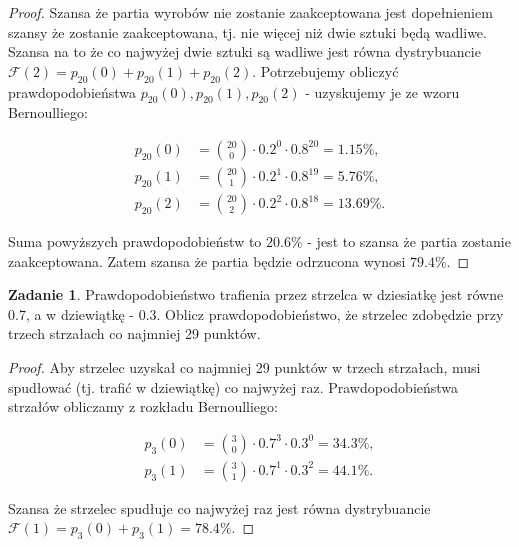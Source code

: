 \documentclass[11pt]{article}
\theoremstyle{definition}
\newtheorem{zadanie}{Zadanie}
\numberwithin{zadanie}{section}
\begin{document}
\begin{proof}
    Szansa że partia wyrobów nie zostanie zaakceptowana jest dopełnieniem szansy że zostanie zaakceptowana, tj. nie więcej niż dwie sztuki będą wadliwe. Szansa na to że co najwyżej dwie sztuki są wadliwe jest równa dystrybuancie $\mathcal F(2) = p_{20}(0)+p_{20}(1)+p_{20}(2)$. Potrzebujemy obliczyć prawdopodobieństwa $ p_{20}(0), p_{20}(1), p_{20}(2)$ - uzyskujemy je ze wzoru Bernoulliego:

    \begin{align*}
        p_{20}(0) & =\binom{20}{0}\cdot0.2^0\cdot0.8^{20}= 1.15\%,  \\
        p_{20}(1) & =\binom{20}{1}\cdot0.2^1\cdot0.8^{19}= 5.76\%,  \\
        p_{20}(2) & =\binom{20}{2}\cdot0.2^2\cdot0.8^{18}= 13.69\%.
    \end{align*}

    Suma powyższych prawdopodobieństw to $20.6\%$ - jest to szansa że partia zostanie zaakceptowana. Zatem szansa że partia będzie odrzucona wynosi $79.4\%$.

\end{proof}
\begin{zadanie}
    Prawdopodobieństwo trafienia przez strzelca w dziesiatkę jest równe 0.7, a w dziewiątkę - 0.3. Oblicz prawdopodobieństwo, że strzelec zdobędzie przy trzech strzałach co najmniej 29 punktów.
\end{zadanie}
\begin{proof}
    Aby strzelec uzyskał co najmniej 29 punktów w trzech strzałach, musi spudłować (tj. trafić w dziewiątkę) co najwyżej raz. Prawdopodobieństwa strzałów obliczamy z rozkładu Bernoulliego:

    \begin{align*}
        p_{3}(0) & =\binom{3}{0}\cdot0.7^3\cdot0.3^{0}= 34.3\%, \\
        p_{3}(1) & =\binom{3}{1}\cdot0.7^1\cdot0.3^{2}= 44.1\%.
    \end{align*}

    Szansa że strzelec spudłuje co najwyżej raz jest równa dystrybuancie $\mathcal F(1)=p_3(0)+p_3(1) = 78.4\%$.

\end{proof}
\end{document}
